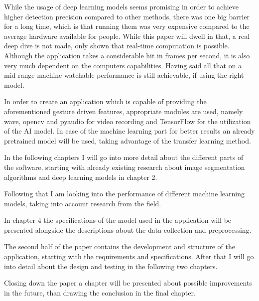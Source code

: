 \par While the usage of deep learning models seems promising in order to achieve higher detection precision compared to other methods, there was one big barrier for a long time, which is that running them was very expensive compared to the average hardware available for people. While this paper will dwell in that, a real deep dive is not made, only shown that real-time computation is possible. Although the application takes a considerable hit in frames per second, it is also very much dependent on the computers capabilities. Having said all that on a mid-range machine watchable performance is still achievable, if using the right model.
\par In order to create an application which is capable of providing the aforementioned gesture driven features, appropriate modules are used, namely wave, opencv and pyaudio for video recording and TensorFlow for the utilization of the AI model. In case of the machine learning part for better results an already pretrained model will be used, taking advantage of the transfer learning method.
\par In the following chapters I will go into more detail about the different parts of the software, starting with already existing research about image segmentation algorithms and deep learning models in chapter 2.
\par Following that I am looking into the performance of different machine learning models, taking into account research from the field.
\par In chapter 4 the specifications of the model used in the application will be presented alongside the descriptions about the data collection and preprocessing.
\par The second half of the paper contains the development and structure of the application, starting with the requirements and specifications. After that I will go into detail about the design and testing in the following two chapters.
\par Closing down the paper a chapter will be presented about possible improvements in the future, than drawing the conclusion in the final chapter.